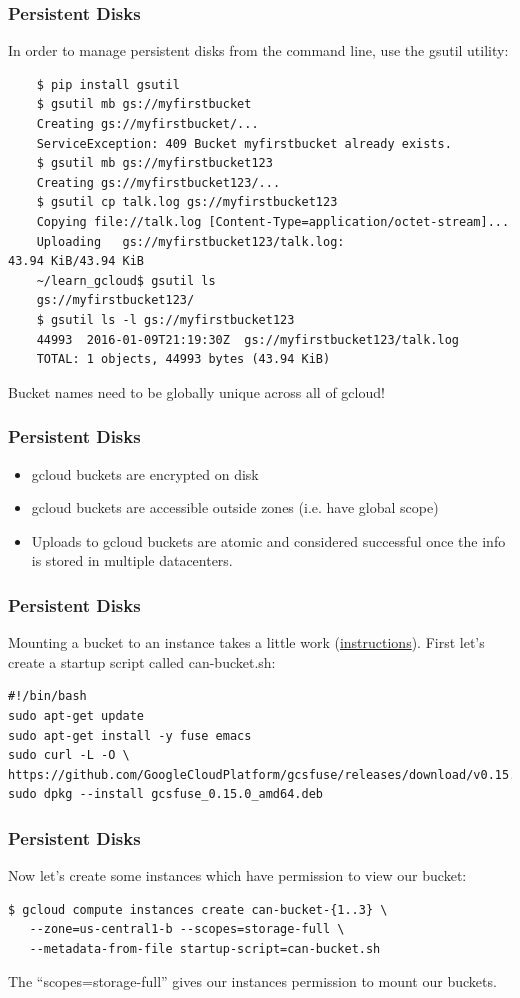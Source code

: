 \documentclass[9pt]{beamer}
\begin{document}
\begin{frame}[fragile]
  \frametitle{Persistent Disks}
  In order to manage persistent disks from the command line, use the gsutil utility:
  \begin{verbatim}
    $ pip install gsutil
    $ gsutil mb gs://myfirstbucket
    Creating gs://myfirstbucket/...
    ServiceException: 409 Bucket myfirstbucket already exists.
    $ gsutil mb gs://myfirstbucket123
    Creating gs://myfirstbucket123/...
    $ gsutil cp talk.log gs://myfirstbucket123
    Copying file://talk.log [Content-Type=application/octet-stream]...
    Uploading   gs://myfirstbucket123/talk.log:                      43.94 KiB/43.94 KiB
    ~/learn_gcloud$ gsutil ls
    gs://myfirstbucket123/
    $ gsutil ls -l gs://myfirstbucket123
    44993  2016-01-09T21:19:30Z  gs://myfirstbucket123/talk.log
    TOTAL: 1 objects, 44993 bytes (43.94 KiB)
  \end{verbatim}
  Bucket names need to be globally unique across all of gcloud!
\end{frame}

\begin{frame}[fragile]
  \frametitle{Persistent Disks}
  \begin{itemize}
  \item gcloud buckets are encrypted on disk
  \item gcloud buckets are accessible outside zones (i.e. have global scope)
  \item Uploads to gcloud buckets are atomic and considered successful once the info is stored in multiple datacenters.
  \end{itemize}
\end{frame}

\begin{frame}[fragile]
\frametitle{Persistent Disks}
Mounting a bucket to an instance takes a little work (\href{https://github.com/googlecloudplatform/gcsfuse/blob/master/docs/installing.md}{instructions}). First let's create a startup script called can-bucket.sh:
\begin{verbatim}
#!/bin/bash
sudo apt-get update
sudo apt-get install -y fuse emacs
sudo curl -L -O \
https://github.com/GoogleCloudPlatform/gcsfuse/releases/download/v0.15.0/gcsfuse_0.15.0_amd64.deb
sudo dpkg --install gcsfuse_0.15.0_amd64.deb
\end{verbatim}
\end{frame}
\begin{frame}[fragile]
\frametitle{Persistent Disks}
Now let's create some instances which have permission to view our bucket:
\begin{verbatim}
$ gcloud compute instances create can-bucket-{1..3} \
   --zone=us-central1-b --scopes=storage-full \
   --metadata-from-file startup-script=can-bucket.sh
\end{verbatim}
The ``scopes=storage-full'' gives our instances permission to mount our buckets.
\end{frame}
\end{document}
